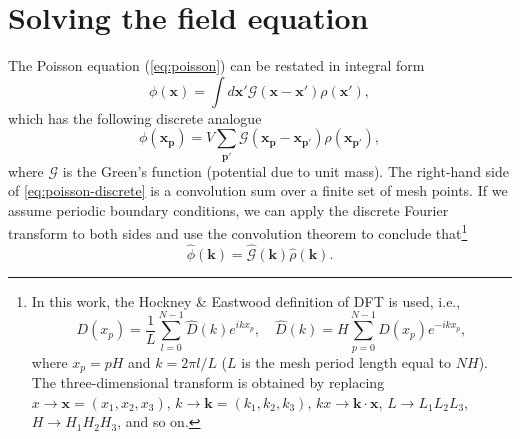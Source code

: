 \section{Solving the field equation}\label{sec:solving-the-field-equation}
The Poisson equation (\autoref{eq:poisson}) can be restated in integral form
\begin{equation*}
    \phi(\mathbf{x}) = \int d\mathbf{x}' \mathcal{G}(\mathbf{x}-\mathbf{x}')\rho(\mathbf{x}'),
\end{equation*}
which has the following discrete analogue
\begin{equation}\label{eq:poisson-discrete}
    \phi(\mathbf{x}_\mathbf{p}) = V \sum_{\mathbf{p}'} \mathcal{G}(\mathbf{x}_\mathbf{p} - \mathbf{x}_{\mathbf{p}'}) \rho(\mathbf{x}_{\mathbf{p}'}),
\end{equation}
where $\mathcal{G}$ is the Green's function (potential due to unit mass).
The right-hand side of \autoref{eq:poisson-discrete} is a convolution sum over a finite set of mesh points.
If we assume periodic boundary conditions, we can apply the discrete Fourier transform to both sides and use the convolution theorem to conclude that\footnote{
    In this work, the Hockney \& Eastwood definition of DFT is used, i.e.,
    \begin{equation*}
        D(x_p) = \frac{1}{L}\sum_{l=0}^{N-1}\hat{D}(k)e^{ikx_p}, \quad \hat{D}(k) = H\sum_{p=0}^{N-1}D(x_p)e^{-ikx_p},
    \end{equation*}
    where $x_p = pH$ and $k=2\pi l / L$ ($L$ is the mesh period length equal to $NH$).
    The three-dimensional transform is obtained by replacing $x \to \mathbf{x}=(x_1, x_2, x_3)$, $k \to \mathbf{k}=(k_1, k_2, k_3)$, $kx \to \mathbf{k} \cdot \mathbf{x}$, $L \to L_1 L_2 L_3$, $H \to H_1 H_2 H_3$, and so on.
}
\begin{equation}\label{eq:poisson-fourier-product}
    \hat{\phi}(\mathbf{k}) = \hat{\mathcal{G}}(\mathbf{k}) \hat{\rho}(\mathbf{k}).
\end{equation}

